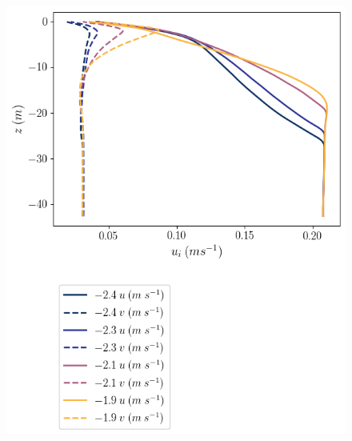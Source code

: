 \documentclass[draft]{styles/agujournal2019}
\begin{document}
\begin{figure}
\begin{minipage}{0.5\textwidth}
    \end{minipage}
    \newline
    \begin{minipage}{0.5\textwidth}
        \includegraphics[trim={0 7.5cm 0 0},clip, width=\textwidth]{Figures/velocity_cmp_dT_40hr_tav1_z_profile.png}
    \end{minipage}%
    \begin{minipage}{0.5\textwidth}

\end{minipage}
\end{figure}
\end{document}
